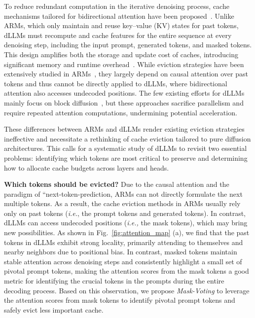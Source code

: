 To reduce redundant computation in the iterative denoising process, cache mechanisms tailored for bidirectional attention have been proposed~\citep{liu2025dllm, wu2025fast, ma2025dkv, hu2025accelerating}. 
Unlike ARMs, which only maintain and reuse key--value (KV) states for past tokens, dLLMs must recompute and cache features for the entire sequence at every denoising step, including the input prompt, generated tokens, and masked tokens. 
This design amplifies both the storage and update cost of caches, introducing significant memory and runtime overhead~\citep{hu2025accelerating}. 
While eviction strategies have been extensively studied in ARMs~\citep{zhang2023h2o,li2024snapkv}, they largely depend on causal attention over past tokens and thus cannot be directly applied to dLLMs, where bidirectional attention also accesses undecoded positions. 
The few existing efforts for dLLMs mainly focus on block diffusion~\citep{wu2025fast,song2025sparse}, but these approaches sacrifice parallelism and require repeated attention computations, undermining potential acceleration.

These differences between ARMs and dLLMs render existing eviction strategies ineffective and necessitate a rethinking of cache eviction tailored to pure diffusion architectures. This calls for a systematic study of dLLMs to revisit two essential problems: identifying which tokens are most critical to preserve and determining how to allocate cache budgets across layers and heads.

\noindent \textbf{Which tokens should be evicted?}
 Due to the causal attention and the paradigm of ``next-token-prediction, ARMs can not directly formulate the next multiple tokens. As a result, the cache eviction methods in ARMs usually rely only on past tokens (\emph{i.e.}, the prompt tokens and generated tokens).
In contrast, dLLMs can access undecoded positions (\emph{i.e.,} the mask tokens), which may bring new possibilities.
As shown in Fig.~\ref{fig:attention_map} (a), we find that the past tokens in dLLMs exhibit strong locality, primarily attending to themselves and nearby neighbors due to positional bias. 
In contrast, masked tokens maintain stable attention across denoising steps and consistently highlight a small set of pivotal prompt tokens, making the attention scores from the mask tokens a good metric for identifying the crucial tokens in the prompts during the entire decoding process.
Based on this observation, we propose \emph{Mask-Voting} to leverage the attention scores from mask tokens to identify pivotal prompt tokens and safely evict less important cache.

